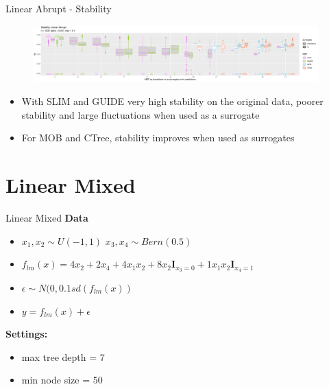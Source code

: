 \documentclass[9pt, xcolor=table]{beamer}
\begin{document}
\begin{frame}{Linear Abrupt - Stability}
\begin{figure}
    \includegraphics[width=11cm]{Figures/simulations/batchtools/basic_scenarios/linear_abrupt/la_1000_standalone_lm_sta.pdf}
\end{figure}     
\begin{itemize}
    \item With SLIM and GUIDE very high stability on the original data, poorer stability and large fluctuations when used as a surrogate
    \item For MOB and CTree, stability improves when used as surrogates
\end{itemize}
\end{frame}


\section{Linear Mixed}
\begin{frame}{Linear Mixed}
\textbf{Data}
\begin{itemize}
    \item $x_1,x_2 \sim U(-1,1)$  $x_3, x_4 \sim Bern(0.5)$
    \item $ f_{lm}(x) = 4 x_2 + 2 x_4 + 4 x_1 x_2 + 8 x_2 \mathbf{I}_{x_3 = 0} + 1 x_1 x_2 \mathbf{I}_{x_4 = 1}  $
    \item $\epsilon \sim N(0, 0.1 sd(f_{lm}(x))$
    \item $y = f_{lm}(x) + \epsilon$
\end{itemize}

\textbf{Settings:}
\begin{itemize}
    \item max tree depth = 7 
    \item min node size = 50    
\end{itemize}

\end{frame}   
\end{document}
